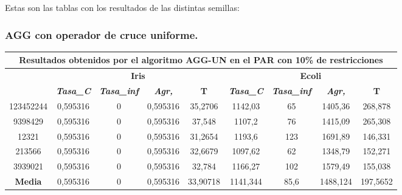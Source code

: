 \documentclass[12pt, spanish]{article}
\begin{document}
Estas son las tablas con los resultados de las distintas semillas:



\subsubsection{AGG con operador de cruce uniforme.}

\begin{table}[H]
\footnotesize
\begin{tabular}{|c|c|c|c|c|c|c|c|c|}
\hline
\multicolumn{9}{|c|}{\textbf{Resultados obtenidos por el algoritmo AGG-UN en el PAR con 10\% de restricciones}}                                                                                                   \\ \hline
\multirow{2}{*}{} & \multicolumn{4}{c|}{\textbf{Iris}}                                                            & \multicolumn{4}{c|}{\textbf{Ecoli}}                                                           \\ \cline{2-9} 
                  & \textit{\textbf{Tasa\_C}} & \textit{\textbf{Tasa\_inf}} & \textit{\textbf{Agr,}} & \textbf{T} & \textit{\textbf{Tasa\_C}} & \textit{\textbf{Tasa\_inf}} & \textit{\textbf{Agr,}} & \textbf{T} \\ \hline
123452244         & 0,595316                  & 0                           & 0,595316               & 35,2706    & 1142,03                   & 65                          & 1405,36                & 268,878    \\ \hline
9398429           & 0,595316                  & 0                           & 0,595316               & 37,548     & 1107,2                    & 76                          & 1415,09                & 265,308    \\ \hline
12321             & 0,595316                  & 0                           & 0,595316               & 31,2654    & 1193,6                    & 123                         & 1691,89                & 146,331    \\ \hline
213566            & 0,595316                  & 0                           & 0,595316               & 32,6679    & 1097,62                   & 62                          & 1348,79                & 152,271    \\ \hline
3939021           & 0,595316                  & 0                           & 0,595316               & 32,784     & 1166,27                   & 102                         & 1579,49                & 155,038    \\ \hline
\textbf{Media}    & 0,595316                  & 0                           & 0,595316               & 33,90718   & 1141,344                  & 85,6                        & 1488,124               & 197,5652   \\ \hline
\end{tabular}
\end{table}
\end{document}
